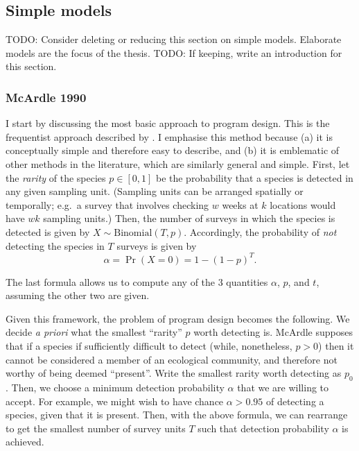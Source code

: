 \documentclass[
]{book}
\begin{document}
\hypertarget{simple-models}{%
\subsection{Simple models}\label{simple-models}}

TODO: Consider deleting or reducing this section on simple models. Elaborate models are the focus of the thesis.
TODO: If keeping, write an introduction for this section.

\hypertarget{mcardle-1990}{%
\subsubsection{McArdle 1990}\label{mcardle-1990}}

I start by discussing the most basic approach to program design. This is the frequentist approach described by \citet{mcardle1990}. I emphasise this method because (a) it is conceptually simple and therefore easy to describe, and (b) it is emblematic of other methods in the literature, which are similarly general and simple. First, let the \emph{rarity} of the species \(p \in [0, 1]\) be the probability that a species is detected in any given sampling unit. (Sampling units can be arranged spatially or temporally; e.g.~a survey that involves checking \(w\) weeks at \(k\) locations would have \(wk\) sampling units.) Then, the number of surveys in which the species is detected is given by \(X \sim \mathrm{Binomial}(T, p)\). Accordingly, the probability of \emph{not} detecting the species in \(T\) surveys is given by
\[
\alpha = \Pr(X = 0) = 1 - (1 - p)^T.
\]

The last formula allows us to compute any of the 3 quantities \(\alpha\), \(p\), and \(t\), assuming the other two are given.

Given this framework, the problem of program design becomes the following. We decide \emph{a priori} what the smallest ``rarity'' \(p\) worth detecting is. McArdle supposes that if a species if sufficiently difficult to detect (while, nonetheless, \(p > 0\)) then it cannot be considered a member of an ecological community, and therefore not worthy of being deemed ``present''. Write the smallest rarity worth detecting as \(p_0\). Then, we choose a minimum detection probability \(\alpha\) that we are willing to accept. For example, we might wish to have chance \(\alpha > 0.95\) of detecting a species, given that it is present. Then, with the above formula, we can rearrange to get the smallest number of survey units \(T\) such that detection probability \(\alpha\) is achieved.
\end{document}
